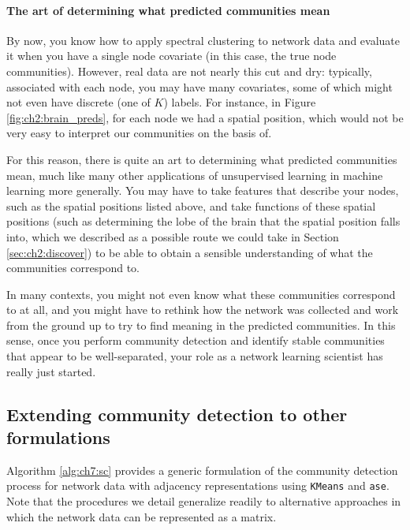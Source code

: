 \paragraph*{The art of determining what predicted communities mean}

By now, you know how to apply spectral clustering to network data and evaluate it when you have a single node covariate (in this case, the true node communities). However, real data are not nearly this cut and dry: typically, associated with each node, you may have many covariates, some of which might not even have discrete (one of $K$) labels. For instance, in Figure \ref{fig:ch2:brain_preds}, for each node we had a spatial position, which would not be very easy to interpret our communities on the basis of.

For this reason, there is quite an art to determining what predicted communities mean, much like many other applications of unsupervised learning in machine learning more generally. You may have to take features that describe your nodes, such as the spatial positions listed above, and take functions of these spatial positions (such as determining the lobe of the brain that the spatial position falls into, which we described as a possible route we could take in Section \ref{sec:ch2:discover}) to be able to obtain a sensible understanding of what the communities correspond to. 

In many contexts, you might not even know what these communities correspond to at all, and you might have to rethink how the network was collected and work from the ground up to try to find meaning in the predicted communities. In this sense, once you perform community detection and identify stable communities that appear to be well-separated, your role as a network learning scientist has really just started.

\subsection{Extending community detection to other formulations}

Algorithm \ref{alg:ch7:sc} provides a generic formulation of the community detection process for network data with adjacency representations using \texttt{KMeans} and \texttt{ase}. Note that the procedures we detail generalize readily to alternative approaches in which the network data can be represented as a matrix. 

